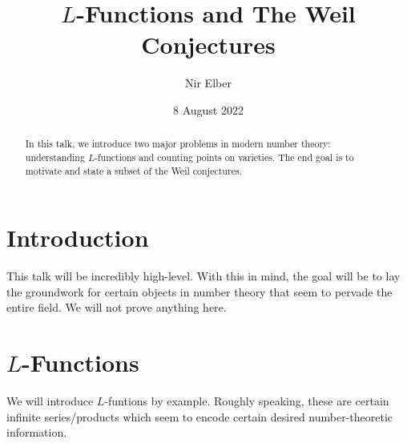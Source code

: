 \documentclass{article}
\title{\texorpdfstring{$L$}{ L}-Functions and The Weil Conjectures}
\author{Nir Elber}
\date{8 August 2022}
\begin{document}
\maketitle

\begin{abstract}
	\noindent In this talk, we introduce two major problems in modern number theory: understanding $L$-functions and counting points on varieties. The end goal is to motivate and state a subset of the Weil conjectures.
\end{abstract}

\tableofcontents

\section{Introduction}
This talk will be incredibly high-level. With this in mind, the goal will be to lay the groundwork for certain objects in number theory that seem to pervade the entire field. We will not prove anything here.

\section{\texorpdfstring{$L$}{L}-Functions} \label{sec:lfunc}
We will introduce $L$-funtions by example. Roughly speaking, these are certain infinite series/products which seem to encode certain desired number-theoretic information.
\end{document}
